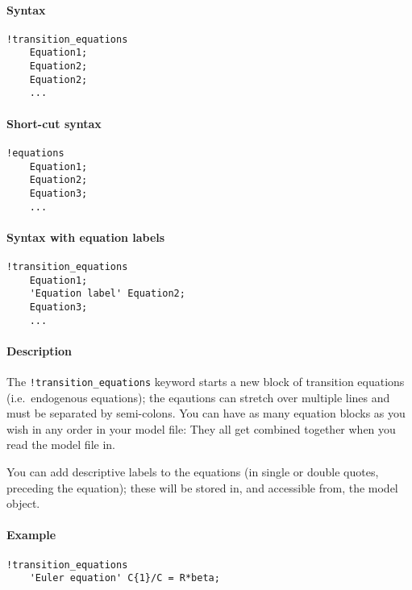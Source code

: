 


	\paragraph{Syntax}\label{syntax}

\begin{verbatim}
!transition_equations
    Equation1;
    Equation2;
    Equation2;
    ...
\end{verbatim}

\paragraph{Short-cut syntax}\label{short-cut-syntax}

\begin{verbatim}
!equations
    Equation1;
    Equation2;
    Equation3;
    ...
\end{verbatim}

\paragraph{Syntax with equation
labels}\label{syntax-with-equation-labels}

\begin{verbatim}
!transition_equations
    Equation1;
    'Equation label' Equation2;
    Equation3;
    ...
\end{verbatim}

\paragraph{Description}\label{description}

The \texttt{!transition\_equations} keyword starts a new block of
transition equations (i.e.~endogenous equations); the eqautions can
stretch over multiple lines and must be separated by semi-colons. You
can have as many equation blocks as you wish in any order in your model
file: They all get combined together when you read the model file in.

You can add descriptive labels to the equations (in single or double
quotes, preceding the equation); these will be stored in, and accessible
from, the model object.

\paragraph{Example}\label{example}

\begin{verbatim}
!transition_equations
    'Euler equation' C{1}/C = R*beta;
\end{verbatim}


